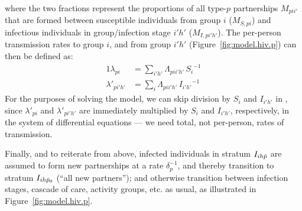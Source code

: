 where the two fractions represent the proportions of all type-$p$ partnerships $M_{pii'}$
that are formed between susceptible individuals from group $i$ ($M_{S,pi}$)
and infectious individuals in group/infection stage $i'h'$ ($M_{I,pi'h'}$).
The per-person transmission rates to group $i$, and from group $i'h'$
(Figure~\ref{fig:model.hiv.p}) can then be defined as:
\begin{alignat}{1}
  \lambda_{pi} &= \sum_{i'h'} \Lambda_{pii'h'}\,{S_{i}}^{-1} \label{eq:foi.i} \\
  \lambda'_{pi'h'} &= \sum_{i} \Lambda_{pii'h'}\,{I_{i'h'}}^{-1} \label{eq:foi.jh}
\end{alignat}
For the purposes of solving the model,
we can skip division by $S_{i}$ and $I_{i'h'}$ in ,
since $\lambda'_{pi}$ and $\lambda'_{pi'h'}$ are immediately multiplied by $S_{i}$ and $I_{i'h'}$,
respectively, in the system of differential equations
--- \ie we need total, not per-person, rates of transmission.
\par
Finally, and to reiterate from above, infected individuals in stratum $I_{ih\bar{p}}$
are assumed to form new partnerships at a rate $\delta_p^{-1}$,
and thereby transition to stratum $I_{ih\bar{p}_0}$ (``all new partners''); and
otherwise transition between infection stages, cascade of care, activity groups, etc. as usual,
as illustrated in Figure~\ref{fig:model.hiv.p}.
